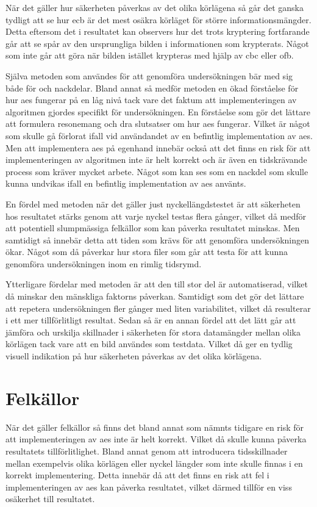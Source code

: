 När det gäller hur säkerheten påverkas av det olika körlägena så går det ganska tydligt att se hur \acrshort{ecb} är det mest osäkra körläget för större informationsmängder.
Detta eftersom det i resultatet kan observers hur det trots kryptering fortfarande går att se spår av den ursprungliga bilden i informationen som krypterats. Något som inte
går att göra när bilden istället krypteras med hjälp av \acrshort{cbc} eller \acrshort{ofb}.

Själva metoden som användes för att genomföra undersökningen bär med sig både för och nackdelar. Bland annat så medför metoden en ökad förståelse för hur \acrfull{aes} fungerar
på en låg nivå tack vare det faktum att implementeringen av algoritmen gjordes specifikt för undersökningen. En förståelse som gör det lättare att formulera resonemang och
dra slutsatser om hur \acrshort{aes} fungerar. Vilket är något som skulle gå förlorat ifall vid användandet av en befintlig implementation av \acrshort{aes}. Men att implementera
\acrshort{aes} på egenhand innebär också att det finns en risk för att implementeringen av algoritmen inte är helt korrekt och är även en tidskrävande process som kräver
mycket arbete. Något som kan ses som en nackdel som skulle kunna undvikas ifall en befintlig implementation av \acrshort{aes} använts.

En fördel med metoden när det gäller just nyckellängdstestet är att säkerheten hos resultatet stärks genom att varje nyckel testas flera gånger, vilket då medför att
potentiell slumpmässiga felkällor som kan påverka resultatet minskas. Men samtidigt så innebär detta att tiden som krävs för att genomföra undersökningen ökar. Något som
då påverkar hur stora filer som går att testa för att kunna genomföra undersökningen inom en rimlig tidsrymd.

Ytterligare fördelar med metoden är att den till stor del är automatiserad, vilket då minskar den mänskliga faktorns påverkan. Samtidigt som det gör det lättare att
repetera undersökningen fler gånger med liten variabilitet, vilket då resulterar i ett mer tillförlitligt resultat. Sedan så är
en annan fördel att det lätt går att jämföra och urskilja skillnader i säkerheten för stora datamängder mellan olika körlägen tack vare att en bild användes som testdata.
Vilket då ger en tydlig visuell indikation på hur säkerheten påverkas av det olika körlägena.

\section{Felkällor} %
\label{sec:errors}
När det gäller felkällor så finns det bland annat som nämnts tidigare en risk för att implementeringen av \acrshort{aes} inte är helt korrekt. Vilket
då skulle kunna påverka resultatets tillförlitlighet. Bland annat genom att introducera tidsskillnader mellan exempelvis olika körlägen eller nyckel längder som inte skulle finnas i en korrekt implementering. Detta innebär
då att det finns en risk att fel i implementeringen av \acrshort{aes} kan påverka resultatet, vilket därmed tillför en viss osäkerhet till resultatet. %

